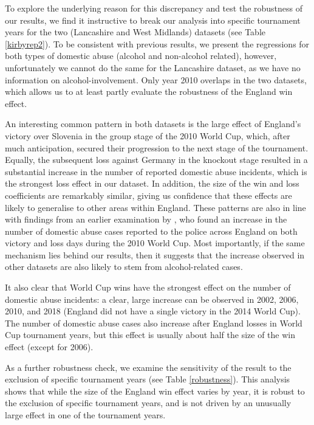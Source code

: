 \documentclass[12pt, a4paper]{article}
\begin{document}
To explore the underlying reason for this discrepancy and test the robustness of our results, we find it instructive to break our analysis into specific tournament years for the two (Lancashire and West Midlands) datasets (see Table \ref{kirbyrep2}). To be consistent with previous results, we present the regressions for both types of domestic abuse (alcohol and non-alcohol related), however, unfortunately we cannot do the same for the Lancashire dataset, as we have no information on alcohol-involvement. Only year 2010 overlaps in the two datasets, which allows us to at least partly evaluate the robustness of the England win effect.

 An interesting common pattern in both datasets is the large effect of England's victory over Slovenia in the group stage of the 2010 World Cup, which, after much anticipation, secured their progression to the next stage of the tournament. Equally, the subsequent loss against Germany in the knockout stage resulted in a substantial increase in the number of reported domestic abuse incidents, which is the strongest loss effect in our dataset. In addition, the size of the win and loss coefficients are remarkably similar, giving us confidence that these effects are likely to generalise to other areas within England. These patterns are also in line with findings from an earlier examination by \cite{Brimicombe2012}, who found an increase in the number of domestic abuse cases reported to the police across England on both victory and loss days during the 2010 World Cup.  Most importantly, if the same mechanism lies behind our results, then it suggests that the increase observed in other datasets are also likely to stem from alcohol-related cases. 
   
  It also clear that World Cup wins have the strongest effect on the number of domestic abuse incidents: a clear, large increase can be observed in 2002, 2006, 2010, and 2018 (England did not have a single victory in the 2014 World Cup). The number of domestic abuse cases also increase after England losses in World Cup tournament years, but this effect is usually about half the size of the win effect (except for 2006).
  
  As a further robustness check, we examine the sensitivity of the result to the exclusion of specific tournament years  (see Table \ref{robustness}). This analysis shows that while the size of the England win effect varies by year, it is robust to the exclusion of specific tournament years, and is not driven by an unusually large effect in one of the tournament years.
\end{document}
